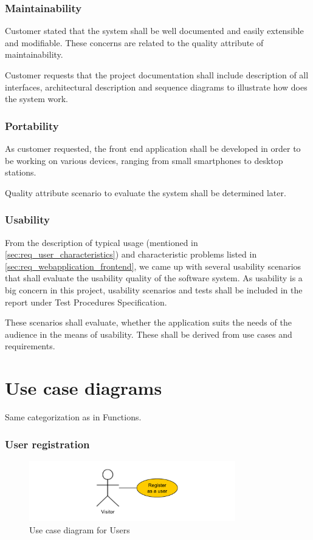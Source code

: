 \documentclass[11pt]{book}
\begin{document}
\subsubsection{Maintainability}
Customer stated that the system shall be well documented and easily extensible and modifiable. These concerns are related to the quality attribute of maintainability.

Customer requests that the project documentation shall include description of all interfaces, architectural description and sequence diagrams to illustrate how does the system work.

\subsubsection{Portability}
As customer requested, the front end application shall be developed in order to be working on various devices, ranging from small smartphones to desktop stations.

Quality attribute scenario to evaluate the system shall be determined later.

\subsubsection{Usability}\label{sec:req_usability}
From the description of typical usage (mentioned in \ref{sec:req_user_characteristics}) and characteristic problems listed in \ref{sec:req_webapplication_frontend}, we came up with several usability scenarios that shall evaluate the usability quality of the software system. As usability is a big concern in this project, usability scenarios and tests shall be included in the report under Test Procedures Specification.  %

These scenarios shall evaluate, whether the application suits the needs of the audience in the means of usability. These shall be derived from use cases and requirements.

\section{Use case diagrams}
Same categorization as in Functions. 

\subsubsection{User registration}
\begin{figure}[H]
      \centering
      \includegraphics[width=0.8\textwidth]{Figures/Requirements/user_registration.pdf}
      \caption{Use case diagram for Users}
      \label{fig:req_usecase_users}
\end{figure}
\end{document}
